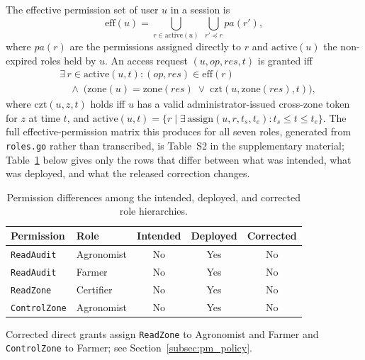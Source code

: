 \documentclass[a4paper,fleqn]{cas-dc}
\begin{document}
The effective permission set of user $u$ in a session is
\begin{equation}
\mathrm{eff}(u) = \bigcup_{r \in \mathrm{active}(u)}
  \; \bigcup_{r' \preceq r} pa(r'),
\end{equation}
where $pa(r)$ are the permissions assigned directly to $r$ and
$\mathrm{active}(u)$ the non-expired roles held by $u$. An access request
$(u, \mathit{op}, \mathit{res}, t)$ is granted iff
\begin{equation}
\begin{aligned}
&\exists\, r \in \mathrm{active}(u,t):
  (\mathit{op},\mathit{res}) \in \mathrm{eff}(r)\\
&\quad \land\;
  \bigl(\mathrm{zone}(u) = \mathrm{zone}(\mathit{res})
  \;\lor\; \mathrm{czt}(u, \mathrm{zone}(\mathit{res}), t)\bigr),
\end{aligned}
\label{eq:grant}
\end{equation}
where $\mathrm{czt}(u,z,t)$ holds iff $u$ has a valid administrator-issued
cross-zone token for $z$ at time $t$, and
$\mathrm{active}(u,t) = \{r \mid \exists\,\mathrm{assign}(u,r,t_s,t_e):
t_s \le t \le t_e\}$. The full effective-permission matrix this produces for
all seven roles, generated from \texttt{roles.go} rather than transcribed,
is Table~S2 in the supplementary material; Table~\ref{tab:permdiff} below
gives only the rows that differ between what was intended, what was
deployed, and what the released correction changes.

\begin{table}[pos=t]
\caption{Permission differences among the intended, deployed, and corrected role hierarchies.}
\label{tab:permdiff}
\footnotesize
\begin{tabularx}{\columnwidth}{@{}lXccc@{}}
\toprule
Permission & Role & Intended & Deployed & Corrected \\
\midrule
\texttt{ReadAudit}   & {\scriptsize Agronomist} & No & Yes & No \\
\texttt{ReadAudit}   & Farmer     & No & Yes & No \\
\texttt{ReadZone}    & Certifier  & No & Yes & No \\
\texttt{ControlZone} & {\scriptsize Agronomist} & No & Yes & No \\
\bottomrule
\end{tabularx}
\par\smallskip
\footnotesize Corrected direct grants assign \texttt{ReadZone} to Agronomist
and Farmer and \texttt{ControlZone} to Farmer; see
Section~\ref{subsec:pm_policy}.
\end{table}
\end{document}
